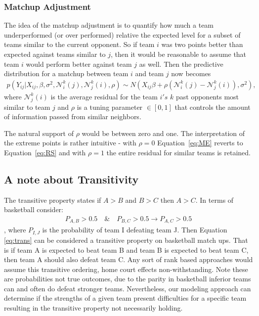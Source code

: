 \subsubsection{Matchup Adjustment}
The idea of the matchup adjustment is to quantify how much a team underperformed (or over performed) relative the expected level for a subset of teams similar to the current opponent.  So if team $i$ was two points better than expected against teams similar to $j$, then it would be reasonable to assume that team $i$ would perform better against team $j$ as well.  Then the predictive distribution for a matchup between team $i$ and team $j$ now becomes
\begin{eqnarray}
p(Y_{ij}|X_{ij}, \beta,\sigma^2,\mathcal{N}_i^k(j),\mathcal{N}_j^k(i), \rho) \sim N(X_{ij} \beta + \rho(\mathcal{N}_i^k(j) -\mathcal{N}_j^k(i)), \sigma^2),
\label{eq:ME}
\end{eqnarray}
where $\mathcal{N}_j^k(i)$ is the average residual for the team $i's$ $k$ past opponents most similar to team $j$ and $\rho$ is a tuning parameter $\in [0,1]$ that controls the amount of information passed from similar neighbors. 

The natural support of $\rho$ would be between zero and one.  The interpretation of the extreme points is rather intuitive - with $\rho = 0$ Equation~\ref{eq:ME} reverts to Equation~\ref{eq:RS} and with $\rho = 1$ the entire residual for similar teams is retained. 
\subsection{A note about Transitivity}
The transitive property states if $A>B$ and $B>C$ then $A>C$.   In terms of basketball consider:
\begin{eqnarray}
P_{A,B} > 0.5 \quad \& \quad P_{B,C} > 0.5 \rightarrow P_{A,C} > 0.5
\label{eq:trans}
\end{eqnarray}
, where $P_{I,J}$ is the probability of team I defeating team J.  Then Equation \ref{eq:trans} can be considered a transitive property on basketball match ups.  That is if team A is expected to beat team B and team B is expected to beat team C, then team A should also defeat team C.  Any sort of rank based approaches would assume this transitive ordering, home court effects non-withstanding.  Note these are probabilities not true outcomes, due to the parity in basketball inferior teams can and often do defeat stronger teams.  Nevertheless, our modeling approach can determine if the strengths of a given team present difficulties for a specific team resulting in the transitive property not necessarily holding.
